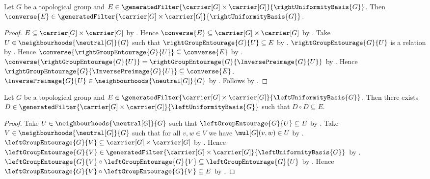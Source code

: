 \begin{proposition}\label{right_generated_uniformity_converse}
    Let $G$ be a topological group and
        $E\in\generatedFilter
            {\carrier[G]\times\carrier[G]}{\rightUniformityBasis{G}}$.
    Then $\converse{E}\in\generatedFilter
        {\carrier[G]\times\carrier[G]}{\rightUniformityBasis{G}}$.
\end{proposition}
\begin{proof}
    $E\subseteq\carrier[G]\times\carrier[G]$
        by .
    Hence $\converse{E}\subseteq\carrier[G]\times\carrier[G]$
        by .
    Take $U\in\neighbourhoods{\neutral[G]}{G}$ such that
        $\rightGroupEntourage{G}{U}\subseteq E$
        by .
    $\rightGroupEntourage{G}{U}$ is a relation
        by .
    Hence $\converse{\rightGroupEntourage{G}{U}}
        \subseteq\converse{E}$ by .
    $\converse{\rightGroupEntourage{G}{U}}
        =\rightGroupEntourage{G}{\InversePreimage{G}{U}}$
        by .
    Hence $\rightGroupEntourage{G}{\InversePreimage{G}{U}}
        \subseteq\converse{E}$.
    $\InversePreimage{G}{U}
        \in\neighbourhoods{\neutral[G]}{G}$
        by .
    Follows by .
\end{proof}

\begin{proposition}\label{left_generated_uniformity_square}
    Let $G$ be a topological group and
        $E\in\generatedFilter
            {\carrier[G]\times\carrier[G]}{\leftUniformityBasis{G}}$.
    Then there exists $D\in\generatedFilter
        {\carrier[G]\times\carrier[G]}{\leftUniformityBasis{G}}$ such that
        $D\circ D\subseteq E$.
\end{proposition}
\begin{proof}
    Take $U\in\neighbourhoods{\neutral[G]}{G}$ such that
        $\leftGroupEntourage{G}{U}\subseteq E$
        by .
    Take $V\in\neighbourhoods{\neutral[G]}{G}$ such that
        for all $v,w\in V$ we have $\mul[G](v,w)\in U$
        by
        .
    $\leftGroupEntourage{G}{V}\subseteq\carrier[G]\times\carrier[G]$
        by .
    Hence $\leftGroupEntourage{G}{V}\in\generatedFilter
        {\carrier[G]\times\carrier[G]}{\leftUniformityBasis{G}}$
        by .
    $\leftGroupEntourage{G}{V}\circ\leftGroupEntourage{G}{V}
        \subseteq\leftGroupEntourage{G}{U}$
        by .
    Hence $\leftGroupEntourage{G}{V}\circ\leftGroupEntourage{G}{V}
        \subseteq E$ by .
\end{proof}

